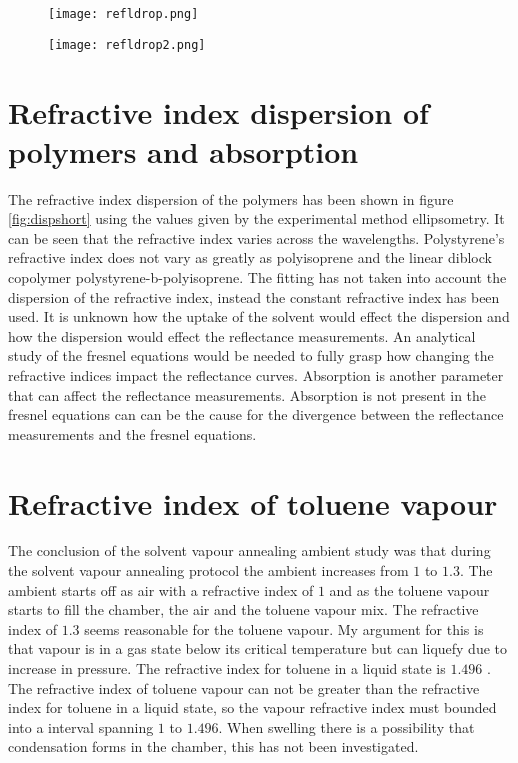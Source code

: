 \documentclass[MasterThesisMain.tex]{subfiles}
\begin{document}
\begin{figure}[H]
\centering
\texttt{[image: refldrop.png]}
\caption{}
\label{fig:drop}
\end{figure}

\begin{figure}[H]
\centering
\texttt{[image: refldrop2.png]}
\caption{}
\label{fig:drop2}
\end{figure}

\section{Refractive index dispersion of polymers and absorption}
The refractive index dispersion of the polymers has been shown in figure \ref{fig:dispshort} using the values given by the experimental method ellipsometry. It can be seen that the refractive index varies across the wavelengths. Polystyrene's refractive index does not vary as greatly as polyisoprene and the linear diblock copolymer polystyrene-b-polyisoprene. The fitting has not taken into account the dispersion of the refractive index, instead the constant refractive index has been used. It is unknown how the uptake of the solvent would effect the dispersion and how the dispersion would effect the reflectance measurements. An analytical study of the fresnel equations would be needed to fully grasp how changing the refractive indices impact the reflectance curves. Absorption is another parameter that can affect the reflectance measurements. Absorption is not present in the fresnel equations can can be the cause for the divergence between the reflectance measurements and the fresnel equations. 

\section{Refractive index of toluene vapour}   
The conclusion of the solvent vapour annealing ambient study was that during the solvent vapour annealing protocol the ambient increases from $1$ to $1.3$. The ambient starts off as air with a refractive index of $1$ and as the toluene vapour starts to fill the chamber, the air and the toluene vapour mix. The refractive index of $1.3$ seems reasonable for the toluene vapour. My argument for this is that vapour is in a gas state below its critical temperature but can liquefy due to increase in pressure. The refractive index for toluene in a liquid state is $1.496$ \cite{toluene}. The refractive index of toluene vapour can not be greater than the refractive index for toluene in a liquid state, so the vapour refractive index must bounded into a interval spanning $1$ to $1.496$. When swelling there is a possibility that condensation forms in the chamber, this has not been investigated.  
\end{document}
